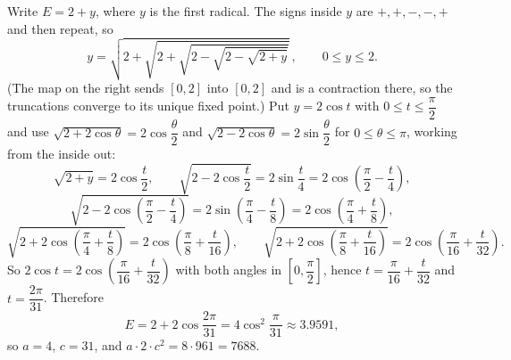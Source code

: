 Write $E=2+y$, where $y$ is the first radical. The signs inside $y$ are $+,+,-,-,+$ and then repeat, so
\[
y=\sqrt{2+\sqrt{2+\sqrt{2-\sqrt{2-\sqrt{2+y}}}}}\,,\qquad 0\le y\le2 .
\]
(The map on the right sends $[0,2]$ into $[0,2]$ and is a contraction there, so the truncations converge to its unique fixed point.) Put $y=2\cos t$ with $0\le t\le\dfrac{\pi}{2}$ and use $\sqrt{2+2\cos\theta}=2\cos\dfrac{\theta}{2}$ and $\sqrt{2-2\cos\theta}=2\sin\dfrac{\theta}{2}$ for $0\le\theta\le\pi$, working from the inside out:
\[
\sqrt{2+y}=2\cos\dfrac{t}{2},\qquad \sqrt{2-2\cos\dfrac{t}{2}}=2\sin\dfrac{t}{4}=2\cos\left(\dfrac{\pi}{2}-\dfrac{t}{4}\right),
\]
\[
\sqrt{2-2\cos\left(\dfrac{\pi}{2}-\dfrac{t}{4}\right)}=2\sin\left(\dfrac{\pi}{4}-\dfrac{t}{8}\right)=2\cos\left(\dfrac{\pi}{4}+\dfrac{t}{8}\right),
\]
\[
\sqrt{2+2\cos\left(\dfrac{\pi}{4}+\dfrac{t}{8}\right)}=2\cos\left(\dfrac{\pi}{8}+\dfrac{t}{16}\right),\qquad \sqrt{2+2\cos\left(\dfrac{\pi}{8}+\dfrac{t}{16}\right)}=2\cos\left(\dfrac{\pi}{16}+\dfrac{t}{32}\right).
\]
So $2\cos t=2\cos\left(\dfrac{\pi}{16}+\dfrac{t}{32}\right)$ with both angles in $\left[0,\dfrac{\pi}{2}\right]$, hence $t=\dfrac{\pi}{16}+\dfrac{t}{32}$ and $t=\dfrac{2\pi}{31}$. Therefore
\[
E=2+2\cos\dfrac{2\pi}{31}=4\cos^2\dfrac{\pi}{31}\approx3.9591,
\]
so $a=4$, $c=31$, and $a\cdot2\cdot c^2=8\cdot961=\boxed{7688}$.

